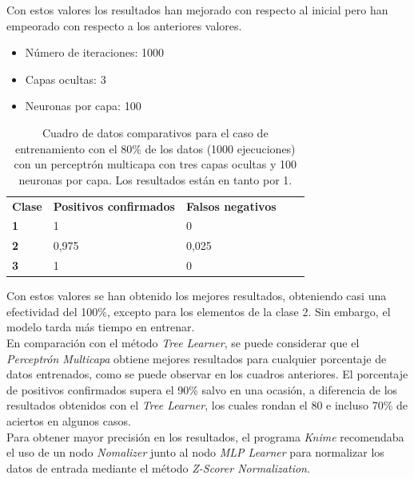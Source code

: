 \documentclass[10pt,a4paper]{article}
\begin{document}
Con estos valores los resultados han mejorado con respecto al inicial pero han empeorado con respecto a los anteriores valores.
\\

\begin{itemize}
	\item Número de iteraciones: 1000
	\item Capas ocultas: 3  
	\item Neuronas por capa: 100
	
\end{itemize}
\begin{table}[h!]
	\centering
	\begin{tabular}{|l|l|l|ll}
		\cline{1-3}
		\multicolumn{1}{|c|}{\textbf{Clase}} & \multicolumn{1}{c|}{\textbf{Positivos confirmados}} & \multicolumn{1}{c|}{\textbf{Falsos negativos}} & \multicolumn{1}{c}{\textbf{}} &  \\ \cline{1-3}
		\textbf{1}                       &        1                      &       0                         &                               &  \\ \cline{1-3}
		\textbf{2}                       &         0,975
		&       0,025 
		&                               &  \\ \cline{1-3}
		\textbf{3}                       &         1                       &      0 &                               &  \\ \cline{1-3}
	\end{tabular}
	\caption{Cuadro de datos comparativos para el caso de entrenamiento con el 80\%{} de los datos (1000 ejecuciones) con un perceptrón multicapa con tres capas ocultas y 100 neuronas por capa. Los resultados están en tanto por 1.}
	\label{tab:ej5_20porcent_3hidden_1000_100}
\end{table}

Con estos valores se han obtenido los mejores resultados, obteniendo casi una efectividad del 100\%, excepto para los elementos de la clase 2. Sin embargo, el modelo tarda más tiempo en entrenar.
\\

En comparación con el método \textit{Tree Learner}, se puede considerar que el \textit{Perceptrón Multicapa} obtiene mejores resultados para cualquier porcentaje de datos entrenados, como se puede observar en los cuadros anteriores. El porcentaje de positivos confirmados supera el 90\%{} salvo en una ocasión, a diferencia de los resultados obtenidos con el \textit{Tree Learner}, los cuales rondan el 80 e incluso 70\%{} de aciertos en algunos casos.\\
Para obtener mayor precisión en los resultados, el programa \textit{Knime} recomendaba el uso de un nodo \textit{Nomalizer} junto al nodo \textit{MLP Learner} para normalizar los datos de entrada mediante el método \textit{Z-Scorer Normalization}.
\end{document}
